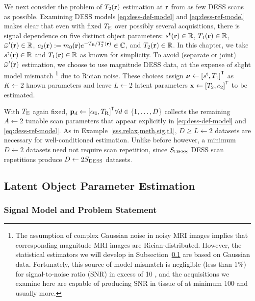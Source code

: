 We next consider 
the problem of $\Tt\pr$ estimation at $\mathbf{r}$
from as few DESS scans as possible.
Examining DESS models 
\eqref{eq:dess-def-model} and \eqref{eq:dess-ref-model}
makes clear that even with fixed $T_\mathrm{E}$
over possibly several acquisitions, 
there is signal dependence 
on five distinct object parameters:
$\stx\pr \in \real$,
$\To\pr \in \real$, 
$\ompmed\pr \in \real$,
$\const{2}\pr := \mzero\pr e^{-\TE/\Tts\pr} \in \complex$, 
and $\Tt\pr \in \real$.
In this chapter,
we take $\stx\pr \in \real$ and $\To\pr \in \real$
as known for simplicity.
To avoid (separate or joint) $\ompmed\pr$ estimation,
we choose to use magnitude DESS data,
at the expense of slight model mismatch
\footnote{The assumption of complex Gaussian noise 
in noisy MRI images
implies that corresponding magnitude MRI images
are Rician-distributed.
However,
the statistical estimators
we will develop
in Subsection~\ref{ss,relax,meth,est}
are based on Gaussian data.
Fortunately,
this source of model mismatch
is negligible (less than $1\%$)
for signal-to-noise ratio (SNR)
in excess of 10 \cite{gudbjartsson:95:trd},
and the acquisitions we examine here
are capable of producing SNR in tissue 
of at minimum $100$ and usually more. 
}
due to Rician noise.
These choices assign 
$\bmnu \gets \brac{\stx, \To}\tpose$ 
as $K \gets 2$
known parameters
and leave $L \gets 2$
latent parameters  
$\bmx \gets \brac{\Tt, \const{2}}\tpose$
to be estimated.

With $T_\mathrm{E}$ again fixed, 
$\bmp_d \gets \brac{\flipnom, \TR}\tpose
\forall d \in \set{1,\dots,D}$
collects the remaining $A \gets 2$ 
tunable scan parameters
that appear explicitly in
\eqref{eq:dess-def-model} and \eqref{eq:dess-ref-model}.
As in Example~\ref{sss,relax,meth,sig,t1},
$D \geq L \gets 2$ datasets are necessary
for well-conditioned estimation.
Unlike before however,
a minimum $D \gets 2$ datasets 
need not require scan repetition,
since $S_{\mathrm{DESS}}$ DESS scan repetitions
produce $D \gets 2S_{\mathrm{DESS}}$ datasets.

\subsection{Latent Object Parameter Estimation}
\label{ss,relax,meth,est}

\subsubsection{Signal Model and Problem Statement}
\label{sss,relax,meth,est,sig}


